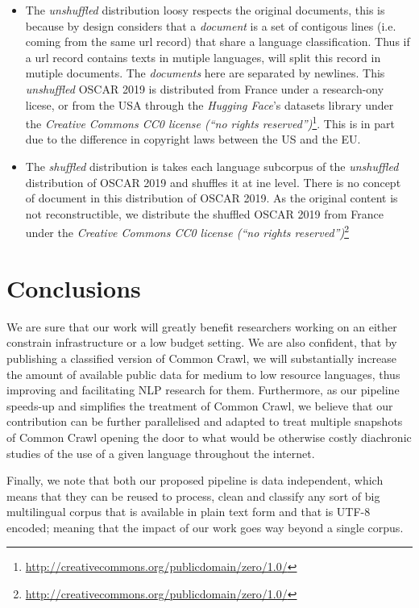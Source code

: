 \begin{itemize}
    \item The \emph{unshuffled} distribution loosy respects the original documents, this is because by design \goclassy considers that a \emph{document} is a set of contigous lines (i.e. coming from the same url record) that share a language classification. Thus if a url record contains texts in mutiple languages, \goclassy will split this record in mutiple documents. The \emph{documents} here are separated by newlines. This \emph{unshuffled} OSCAR 2019 is distributed from France under a research-ony licese, or from the USA through the \emph{Hugging Face}'s datasets library under the \emph{Creative Commons CC0 license (``no rights reserved'')}\footnote{\url{http://creativecommons.org/publicdomain/zero/1.0/}}. This is in part due to the difference in copyright laws between the US and the EU.
    \item The \emph{shuffled} distribution is takes each language subcorpus of the \emph{unshuffled} distribution of OSCAR 2019 and shuffles it at ine level. There is no concept of document in this distribution of OSCAR 2019. As the original content is not reconstructible, we distribute the shuffled OSCAR 2019 from France under the \emph{Creative Commons CC0 license (``no rights reserved'')}\footnote{\url{http://creativecommons.org/publicdomain/zero/1.0/}}
\end{itemize}

\section{Conclusions}

We are sure that our work will greatly benefit researchers working on an either constrain infrastructure or a low budget setting. We are also confident, that by publishing a classified version of Common Crawl, we will substantially increase the amount of available public data for medium to low resource languages, thus improving and facilitating NLP research for them. Furthermore, as our pipeline speeds-up and simplifies the treatment of Common Crawl, we believe that our contribution can be further parallelised and adapted to treat multiple snapshots of Common Crawl opening the door to what would be otherwise costly diachronic studies of the use of a given language throughout the internet.

Finally, we note that both our proposed pipeline is data independent, which means that they can be reused to process, clean and classify any sort of big multilingual corpus that is available in plain text form and that is UTF-8 encoded; meaning that the impact of our work goes way beyond a single corpus.